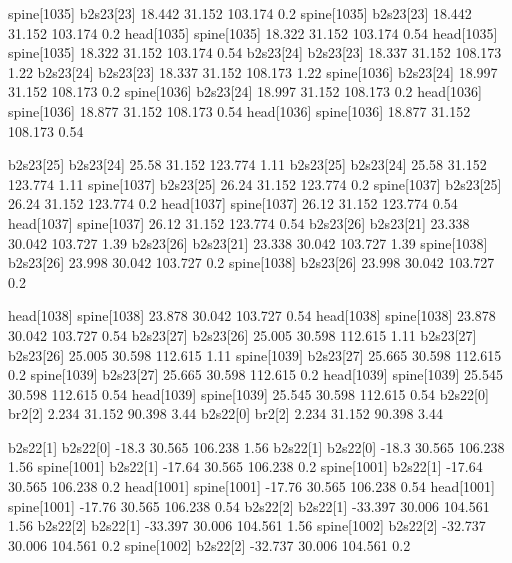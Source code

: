 spine[1035]    b2s23[23]    18.442    31.152    103.174    0.2
spine[1035]    b2s23[23]    18.442    31.152    103.174    0.2
head[1035]    spine[1035]    18.322    31.152    103.174    0.54
head[1035]    spine[1035]    18.322    31.152    103.174    0.54
b2s23[24]    b2s23[23]    18.337    31.152    108.173    1.22
b2s23[24]    b2s23[23]    18.337    31.152    108.173    1.22
spine[1036]    b2s23[24]    18.997    31.152    108.173    0.2
spine[1036]    b2s23[24]    18.997    31.152    108.173    0.2
head[1036]    spine[1036]    18.877    31.152    108.173    0.54
head[1036]    spine[1036]    18.877    31.152    108.173    0.54


b2s23[25]    b2s23[24]    25.58    31.152    123.774    1.11
b2s23[25]    b2s23[24]    25.58    31.152    123.774    1.11
spine[1037]    b2s23[25]    26.24    31.152    123.774    0.2
spine[1037]    b2s23[25]    26.24    31.152    123.774    0.2
head[1037]    spine[1037]    26.12    31.152    123.774    0.54
head[1037]    spine[1037]    26.12    31.152    123.774    0.54
b2s23[26]    b2s23[21]    23.338    30.042    103.727    1.39
b2s23[26]    b2s23[21]    23.338    30.042    103.727    1.39
spine[1038]    b2s23[26]    23.998    30.042    103.727    0.2
spine[1038]    b2s23[26]    23.998    30.042    103.727    0.2


head[1038]    spine[1038]    23.878    30.042    103.727    0.54
head[1038]    spine[1038]    23.878    30.042    103.727    0.54
b2s23[27]    b2s23[26]    25.005    30.598    112.615    1.11
b2s23[27]    b2s23[26]    25.005    30.598    112.615    1.11
spine[1039]    b2s23[27]    25.665    30.598    112.615    0.2
spine[1039]    b2s23[27]    25.665    30.598    112.615    0.2
head[1039]    spine[1039]    25.545    30.598    112.615    0.54
head[1039]    spine[1039]    25.545    30.598    112.615    0.54
b2s22[0]    br2[2]    2.234    31.152    90.398    3.44
b2s22[0]    br2[2]    2.234    31.152    90.398    3.44


b2s22[1]    b2s22[0]    -18.3    30.565    106.238    1.56
b2s22[1]    b2s22[0]    -18.3    30.565    106.238    1.56
spine[1001]    b2s22[1]    -17.64    30.565    106.238    0.2
spine[1001]    b2s22[1]    -17.64    30.565    106.238    0.2
head[1001]    spine[1001]    -17.76    30.565    106.238    0.54
head[1001]    spine[1001]    -17.76    30.565    106.238    0.54
b2s22[2]    b2s22[1]    -33.397    30.006    104.561    1.56
b2s22[2]    b2s22[1]    -33.397    30.006    104.561    1.56
spine[1002]    b2s22[2]    -32.737    30.006    104.561    0.2
spine[1002]    b2s22[2]    -32.737    30.006    104.561    0.2


